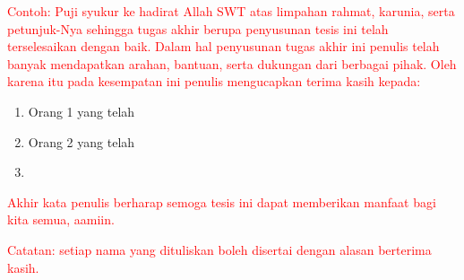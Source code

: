 \textcolor{red}{
Contoh: Puji syukur ke hadirat Allah SWT atas limpahan rahmat, karunia, serta petunjuk-Nya sehingga tugas akhir berupa penyusunan tesis ini telah terselesaikan dengan baik. Dalam hal penyusunan tugas akhir ini penulis telah banyak mendapatkan arahan, bantuan, serta dukungan dari berbagai pihak. Oleh karena itu pada kesempatan ini penulis mengucapkan terima kasih kepada:}


\begin{enumerate}
	\item Orang 1 yang telah
	
	\item Orang 2 yang telah
		
	\item <isi dengan nama orang lainnya>

\end{enumerate}

\textcolor{red}{Akhir kata penulis berharap semoga tesis ini dapat memberikan manfaat bagi kita semua, aamiin.}

\noindent\textcolor{red}{Catatan: setiap nama yang dituliskan boleh disertai dengan alasan berterima kasih.}

